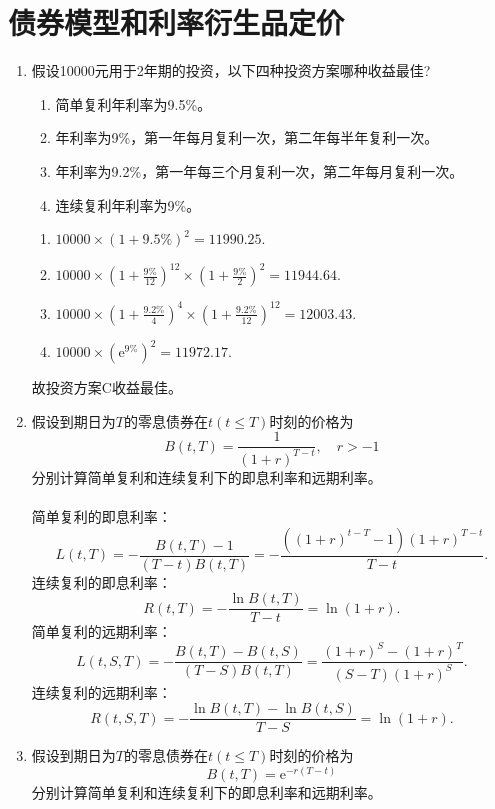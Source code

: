 \section{债券模型和利率衍生品定价}
\begin{enumerate}
    \item 假设10000元用于2年期的投资，以下四种投资方案哪种收益最佳?
    \begin{enumerate}[label=\Alph*.]
        \item 简单复利年利率为9.5\%。
        \item 年利率为9\%，第一年每月复利一次，第二年每半年复利一次。
        \item 年利率为9.2\%，第一年每三个月复利一次，第二年每月复利一次。
        \item 连续复利年利率为9\%。
    \end{enumerate}
    \sol
    \begin{enumerate}[label=\Alph*.]
        \item $10000 \times (1+9.5\%)^2 = 11990.25.$
        \item $\displaystyle 10000 \times \left(1 + \frac{9\%}{12}\right)^{12} \times \left(1 + \frac{9\%}{2}\right)^2 = 11944.64.$
        \item $\displaystyle 10000 \times \left(1 + \frac{9.2\%}{4}\right)^{4} \times \left(1 + \frac{9.2\%}{12}\right)^{12} = 12003.43.$
        \item $10000 \times \left(\mathrm{e}^{9\%}\right)^2 = 11972.17.$
    \end{enumerate}
    故投资方案C收益最佳。
    \item 假设到期日为$T$的零息债券在$t(t \leqslant T)$时刻的价格为
    \[B(t,T)=\frac{1}{(1+r)^{T-t}}, \quad r>-1\]
    分别计算简单复利和连续复利下的即息利率和远期利率。\\
    \sol\\
    简单复利的即息利率：
    \[L(t, T) = -\frac{B(t,T) - 1}{(T - t)B(t, T)} = -\frac{\left({\left(1 + r\right)}^{t - T} - 1\right) {\left(1 + r\right)}^{T - t}}{T - t}.\]
    连续复利的即息利率：
    \[R(t, T) = -\frac{\ln B(t, T)}{T - t} = \ln (1 + r).\]
    简单复利的远期利率：
    \[L(t, S, T) = -\frac{B(t,T)-B(t,S)}{(T-S)B(t,T)}=\frac{{\left(1 + r\right)}^S - {\left(1 + r\right)}^T}{\left(S - T\right) {\left(1 + r\right)}^S}.\]
    连续复利的远期利率：
    \[R(t,S,T) = -\frac{\ln B(t,T) - \ln B(t,S)}{T-S} = \ln (1 + r).\]
    \item 假设到期日为$T$的零息债券在$t(t \leqslant T)$时刻的价格为
    \[B(t,T)=\mathrm{e}^{-r(T-t)}\]
    分别计算简单复利和连续复利下的即息利率和远期利率。\\

\end{enumerate}
